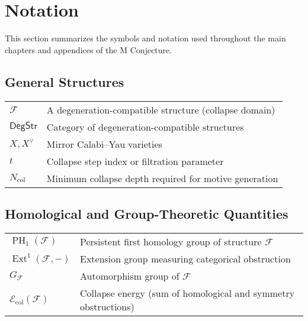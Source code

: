 \documentclass[11pt]{article}
\DeclareMathOperator{\Ext}{Ext}
\DeclareMathOperator{\PH}{PH}
\begin{document}
\FloatBarrier




\section*{Notation}

This section summarizes the symbols and notation used throughout the main chapters and appendices of the M Conjecture.

\subsection*{General Structures}

\begin{tabular}{ll}
$\mathcal{F}$ & A degeneration-compatible structure (collapse domain) \\
$\mathsf{DegStr}$ & Category of degeneration-compatible structures \\
$X, X^\vee$ & Mirror Calabi–Yau varieties \\
$t$ & Collapse step index or filtration parameter \\
$N_{\mathrm{col}}$ & Minimum collapse depth required for motive generation \\
\end{tabular}

\vspace{1em}

\subsection*{Homological and Group-Theoretic Quantities}

\begin{tabular}{ll}
$\PH_1(\mathcal{F})$ & Persistent first homology group of structure $\mathcal{F}$ \\
$\Ext^1(\mathcal{F}, -)$ & Extension group measuring categorical obstruction \\
$G_{\mathcal{F}}$ & Automorphism group of $\mathcal{F}$ \\
$\mathcal{E}_{\mathrm{col}}(\mathcal{F})$ & Collapse energy (sum of homological and symmetry obstructions) \\
\end{tabular}

\vspace{1em}
\end{document}

